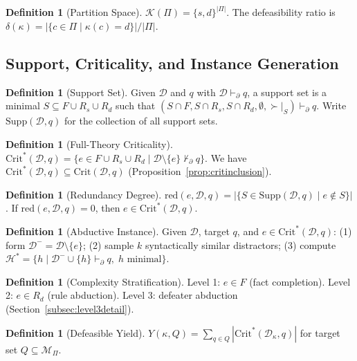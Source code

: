 \documentclass{article}
\theoremstyle{definition}
\newtheorem{definition}[theorem]{Definition}
\newcommand{\D}{\mathcal{D}}
\newcommand{\Dm}{\mathcal{D}^{-}}
\newcommand{\Hgold}{\mathcal{H}^{*}}
\newcommand{\Rs}{R_s}
\newcommand{\Rd}{R_d}
\newcommand{\partfunc}{\kappa}
\newcommand{\Supp}{\mathrm{Supp}}
\newcommand{\Crit}{\mathrm{Crit}}
\newcommand{\CritStar}{\mathrm{Crit}^{*}}
\newcommand{\pPartial}{\vdash_{\partial}}
\begin{document}
\begin{definition}[Partition Space]\label{def:partspace}
$\mathcal{K}(\Pi) = \{s, d\}^{|\Pi|}$. The defeasibility ratio is $\delta(\partfunc) = |\{c \in \Pi \mid \partfunc(c) = d\}|/|\Pi|$.
\end{definition}


\subsection{Support, Criticality, and Instance Generation}

\begin{definition}[Support Set]\label{def:support}
Given $\D$ and $q$ with $\D \pPartial q$, a support set is a minimal $S \subseteq F \cup \Rs \cup \Rd$ such that $(S \cap F, S \cap \Rs, S \cap \Rd, \emptyset, \succ|_S) \pPartial q$. Write $\Supp(\D, q)$ for the collection of all support sets.
\end{definition}

\begin{definition}[Full-Theory Criticality]\label{def:fullcrit}
$\CritStar(\D, q) = \{e \in F \cup \Rs \cup \Rd \mid \D \setminus \{e\} \not\pPartial q\}$. We have $\CritStar(\D, q) \subseteq \Crit(\D, q)$ (Proposition~\ref{prop:critinclusion}).
\end{definition}

\begin{definition}[Redundancy Degree]\label{def:redundancy}
$\mathrm{red}(e, \D, q) = |\{S \in \Supp(\D, q) \mid e \notin S\}|$. If $\mathrm{red}(e, \D, q) = 0$, then $e \in \CritStar(\D, q)$.
\end{definition}

\begin{definition}[Abductive Instance]\label{def:instance}
Given $\D$, target $q$, and $e \in \CritStar(\D, q)$: (1) form $\Dm = \D \setminus \{e\}$; (2) sample $k$ syntactically similar distractors; (3) compute $\Hgold = \{h \mid \Dm \cup \{h\} \pPartial q,\; h \text{ minimal}\}$.
\end{definition}

\begin{definition}[Complexity Stratification]\label{def:levels12}
Level 1: $e \in F$ (fact completion). Level 2: $e \in \Rd$ (rule abduction). Level 3: defeater abduction (Section~\ref{subsec:level3detail}).
\end{definition}

\begin{definition}[Defeasible Yield]\label{def:yield}
$Y(\partfunc, Q) = \sum_{q \in Q} |\CritStar(\D_\partfunc, q)|$ for target set $Q \subseteq \mathcal{M}_\Pi$.
\end{definition}
\end{document}
